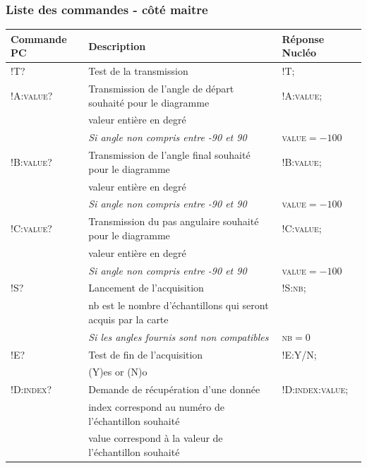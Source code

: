 \documentclass[a4paper,11pt,titlepage]{article} %
\begin{document}
\subsubsection{Liste des commandes - côté maitre}

\begin{center}

\begin{tabular}{|l|l|l|}
\hline 
\textbf{Commande PC} & Description & \textbf{Réponse Nucléo} \\ 
\hline 
\textsc{!T?} & Test de la transmission & \textsc{!T;} \\ 
\hline 
\textsc{!A:value?} & Transmission de l'angle de départ souhaité pour le diagramme & \textsc{!A:value;} \\ 
 &  valeur entière en degré &  \\
 & \textit{Si angle non compris entre -90 et 90} & \textsc{value}$ = -100$ \\ 
\hline 
\textsc{!B:value?} & Transmission de l'angle final souhaité pour le diagramme & \textsc{!B:value;} \\ 
 &  valeur entière en degré &  \\ 
 & \textit{Si angle non compris entre -90 et 90} & \textsc{value}$ = -100$ \\
\hline 
\textsc{!C:value?} & Transmission du pas angulaire souhaité pour le diagramme & \textsc{!C:value;} \\ 
 &  valeur entière en degré &  \\ 
 & \textit{Si angle non compris entre -90 et 90} & \textsc{value}$ = -100$ \\
\hline 
\textsc{!S?} & Lancement de l'acquisition & \textsc{!S:nb;} \\ 
 &  nb est le nombre d'échantillons qui seront acquis par la carte &  \\ 
 & \textit{Si les angles fournis sont non compatibles} & \textsc{nb}$ = 0$ \\
\hline 
\textsc{!E?} & Test de fin de l'acquisition & \textsc{!E:Y/N;} \\
 &  (Y)es or (N)o &  \\  
\hline 
\textsc{!D:index?} & Demande de récupération d'une donnée & \textsc{!D:index:value;} \\
 &  index correspond au numéro de l'échantillon souhaité &  \\  
 &  value correspond à la valeur de l'échantillon souhaité &  \\  
\hline 
\end{tabular} 

\end{center}
\end{document}
